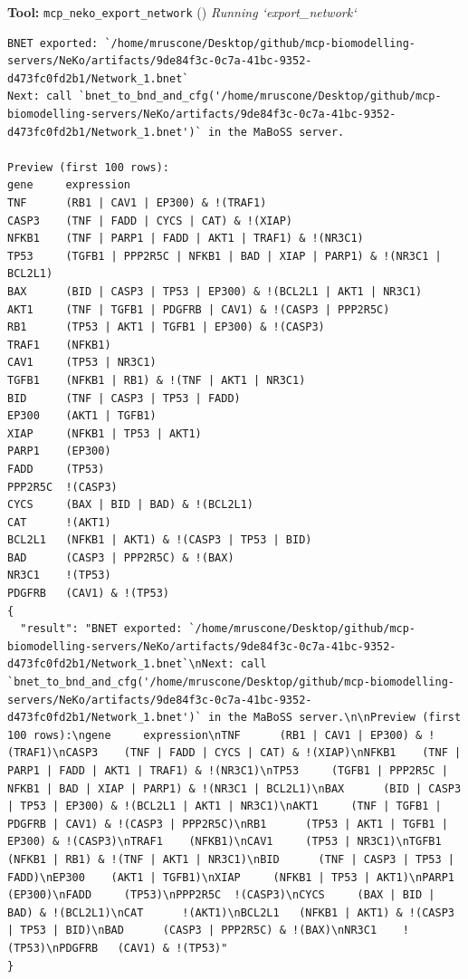 \documentclass[11pt,a4paper]{article}
\begin{document}
\begin{toolokbox}
\textbf{Tool:} \texttt{mcp\_neko\_export\_network} (\checkmark)
\textit{Running `export\_network`}
\begin{lstlisting}
BNET exported: `/home/mruscone/Desktop/github/mcp-biomodelling-servers/NeKo/artifacts/9de84f3c-0c7a-41bc-9352-d473fc0fd2b1/Network_1.bnet`
Next: call `bnet_to_bnd_and_cfg('/home/mruscone/Desktop/github/mcp-biomodelling-servers/NeKo/artifacts/9de84f3c-0c7a-41bc-9352-d473fc0fd2b1/Network_1.bnet')` in the MaBoSS server.

Preview (first 100 rows):
gene     expression
TNF      (RB1 | CAV1 | EP300) & !(TRAF1)
CASP3    (TNF | FADD | CYCS | CAT) & !(XIAP)
NFKB1    (TNF | PARP1 | FADD | AKT1 | TRAF1) & !(NR3C1)
TP53     (TGFB1 | PPP2R5C | NFKB1 | BAD | XIAP | PARP1) & !(NR3C1 | BCL2L1)
BAX      (BID | CASP3 | TP53 | EP300) & !(BCL2L1 | AKT1 | NR3C1)
AKT1     (TNF | TGFB1 | PDGFRB | CAV1) & !(CASP3 | PPP2R5C)
RB1      (TP53 | AKT1 | TGFB1 | EP300) & !(CASP3)
TRAF1    (NFKB1)
CAV1     (TP53 | NR3C1)
TGFB1    (NFKB1 | RB1) & !(TNF | AKT1 | NR3C1)
BID      (TNF | CASP3 | TP53 | FADD)
EP300    (AKT1 | TGFB1)
XIAP     (NFKB1 | TP53 | AKT1)
PARP1    (EP300)
FADD     (TP53)
PPP2R5C  !(CASP3)
CYCS     (BAX | BID | BAD) & !(BCL2L1)
CAT      !(AKT1)
BCL2L1   (NFKB1 | AKT1) & !(CASP3 | TP53 | BID)
BAD      (CASP3 | PPP2R5C) & !(BAX)
NR3C1    !(TP53)
PDGFRB   (CAV1) & !(TP53)
{
  "result": "BNET exported: `/home/mruscone/Desktop/github/mcp-biomodelling-servers/NeKo/artifacts/9de84f3c-0c7a-41bc-9352-d473fc0fd2b1/Network_1.bnet`\nNext: call `bnet_to_bnd_and_cfg('/home/mruscone/Desktop/github/mcp-biomodelling-servers/NeKo/artifacts/9de84f3c-0c7a-41bc-9352-d473fc0fd2b1/Network_1.bnet')` in the MaBoSS server.\n\nPreview (first 100 rows):\ngene     expression\nTNF      (RB1 | CAV1 | EP300) & !(TRAF1)\nCASP3    (TNF | FADD | CYCS | CAT) & !(XIAP)\nNFKB1    (TNF | PARP1 | FADD | AKT1 | TRAF1) & !(NR3C1)\nTP53     (TGFB1 | PPP2R5C | NFKB1 | BAD | XIAP | PARP1) & !(NR3C1 | BCL2L1)\nBAX      (BID | CASP3 | TP53 | EP300) & !(BCL2L1 | AKT1 | NR3C1)\nAKT1     (TNF | TGFB1 | PDGFRB | CAV1) & !(CASP3 | PPP2R5C)\nRB1      (TP53 | AKT1 | TGFB1 | EP300) & !(CASP3)\nTRAF1    (NFKB1)\nCAV1     (TP53 | NR3C1)\nTGFB1    (NFKB1 | RB1) & !(TNF | AKT1 | NR3C1)\nBID      (TNF | CASP3 | TP53 | FADD)\nEP300    (AKT1 | TGFB1)\nXIAP     (NFKB1 | TP53 | AKT1)\nPARP1    (EP300)\nFADD     (TP53)\nPPP2R5C  !(CASP3)\nCYCS     (BAX | BID | BAD) & !(BCL2L1)\nCAT      !(AKT1)\nBCL2L1   (NFKB1 | AKT1) & !(CASP3 | TP53 | BID)\nBAD      (CASP3 | PPP2R5C) & !(BAX)\nNR3C1    !(TP53)\nPDGFRB   (CAV1) & !(TP53)"
}
\end{lstlisting}
\end{toolokbox}
\end{document}
